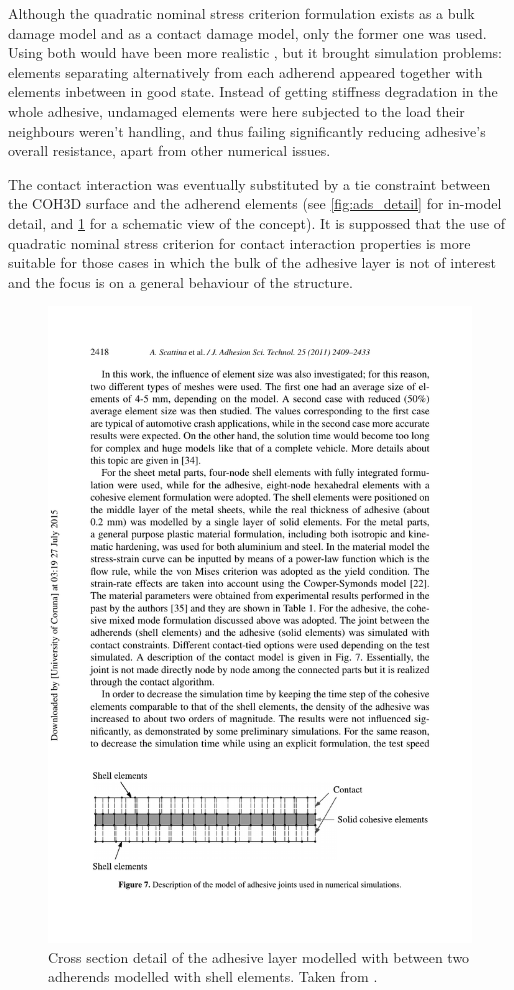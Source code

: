 \documentclass[cmfonts]{witpress}
\begin{document}
Although the quadratic nominal stress criterion formulation exists as a bulk damage model and as a contact damage model, only the former one was used. Using both would have been more realistic \cite{Wu2013}, but it brought simulation problems: elements separating alternatively from each adherend appeared together with elements inbetween in good state. Instead of getting stiffness degradation in the whole adhesive, undamaged elements were here subjected to the load their neighbours weren't handling, and thus failing significantly reducing adhesive's overall resistance, apart from other numerical issues.

The contact interaction was eventually substituted by a tie constraint between the COH3D surface and the adherend elements (see \cref{fig:ads_detail} for in-model detail, and \cref{fig:union} for a schematic view of the concept). It is suppossed that the use of quadratic nominal stress criterion for contact interaction properties is more suitable for those cases in which the bulk of the adhesive layer is not of interest and the focus is on a general behaviour of the structure.

\begin{figure}
	\centering
	\includegraphics[width=0.7\linewidth]{figures/IMG_CUTRES/union}
	\caption[Cross section detail of the adhesive layer modelled with  between two adherends modelled with shell elements.]{Cross section detail of the adhesive layer modelled with  between two adherends modelled with shell elements. Taken from \cite{Scattina2011}.}
	\label{fig:union}
\end{figure}
\end{document}
